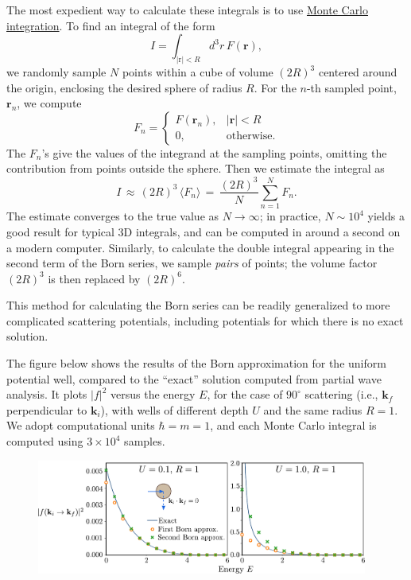 \documentclass[pra,12pt]{revtex4-2}
\begin{document}
The most expedient way to calculate these integrals is to use
\href{https://en.wikipedia.org/wiki/Monte_Carlo_integration}{Monte
  Carlo integration}.  To find an integral of the form
\begin{equation}
  I = \int_{|\mathrm{r}|<R} d^3r \, F(\mathbf{r}),
\end{equation}
we randomly sample $N$ points within a cube of volume $(2R)^3$
centered around the origin, enclosing the desired sphere of radius
$R$.  For the $n$-th sampled point, $\mathbf{r}_n$, we compute
\begin{equation}
  F_n = \begin{cases}F(\mathbf{r}_n), & |\mathbf{r}| < R \\ 0, &\mathrm{otherwise}.\end{cases}
\end{equation}
The $F_n$'s give the values of the integrand at the sampling points,
omitting the contribution from points outside the sphere.  Then we
estimate the integral as
\begin{equation}
  I \,\approx\, (2R)^3 \, \langle F_n\rangle \,=\, \frac{(2R)^3}{N} \sum_{n=1}^N F_n.
\end{equation}
The estimate converges to the true value as $N\rightarrow\infty$; in
practice, $N \sim 10^4$ yields a good result for typical 3D integrals,
and can be computed in around a second on a modern computer.
Similarly, to calculate the double integral appearing in the second
term of the Born series, we sample \textit{pairs} of points; the
volume factor $(2R)^3$ is then replaced by $(2R)^6$.

This method for calculating the Born series can be readily generalized
to more complicated scattering potentials, including potentials for
which there is no exact solution.

The figure below shows the results of the Born approximation for the
uniform potential well, compared to the ``exact'' solution computed
from partial wave analysis.  It plots $|f|^2$ versus the energy $E$,
for the case of $90^\circ$ scattering (i.e., $\mathbf{k}_f$
perpendicular to $\mathbf{k}_i$), with wells of different depth $U$
and the same radius $R = 1$.  We adopt computational units $\hbar = m
= 1$, and each Monte Carlo integral is computed using $3\times10^4$
samples.

\begin{figure}[h]
  \centering\includegraphics[width=0.97\textwidth]{spherical_well_scattering}
\end{figure}
\end{document}
